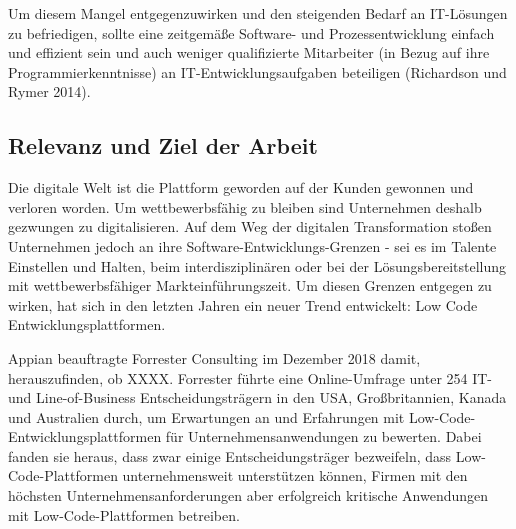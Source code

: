 \documentclass{article}
\begin{document}
	Um diesem Mangel entgegenzuwirken und den steigenden Bedarf an IT-Lösungen zu befriedigen, sollte eine zeitgemäße Software- und Prozessentwicklung einfach und effizient sein und auch weniger qualifizierte Mitarbeiter (in Bezug auf ihre Programmierkenntnisse) an IT-Entwicklungsaufgaben beteiligen (Richardson und Rymer 2014).
	
	\subsection{Relevanz und Ziel der Arbeit}
	
	
	
	Die digitale Welt ist die Plattform geworden auf der Kunden gewonnen und verloren worden. Um wettbewerbsfähig zu bleiben sind Unternehmen deshalb gezwungen zu digitalisieren. Auf dem Weg der digitalen Transformation stoßen Unternehmen jedoch an ihre Software-Entwicklungs-Grenzen - sei es im Talente Einstellen und Halten, beim interdisziplinären %
	oder bei der Lösungsbereitstellung mit wettbewerbsfähiger Markteinführungszeit.	
	Um diesen Grenzen entgegen zu wirken, hat sich in den letzten Jahren ein neuer Trend entwickelt: Low Code Entwicklungsplattformen. \cite{EmmaVanPelt.2019} %
	
	Appian beauftragte Forrester Consulting im Dezember 2018 damit, herauszufinden, ob XXXX. Forrester führte eine Online-Umfrage unter 254 IT- und Line-of-Business Entscheidungsträgern in den USA, Großbritannien, Kanada und Australien durch, um Erwartungen an und Erfahrungen mit  Low-Code-Entwicklungsplattformen für Unternehmensanwendungen zu bewerten. Dabei fanden sie heraus, dass zwar einige Entscheidungsträger bezweifeln, dass Low-Code-Plattformen unternehmensweit unterstützen können, Firmen mit den höchsten Unternehmensanforderungen aber erfolgreich kritische Anwendungen mit Low-Code-Plattformen betreiben.	  \cite{EmmaVanPelt.2019}	
	
\end{document}

